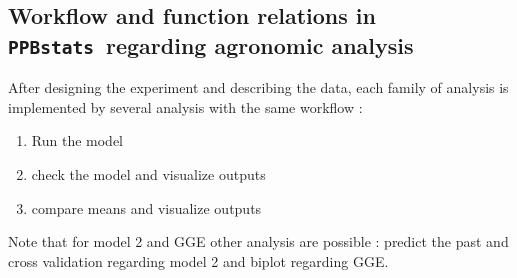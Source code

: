 \documentclass{book}\usepackage[]{graphicx}\usepackage[]{color}
\newcommand{\pack}{\texttt{PPBstats}}
\begin{document}
%
%
%

\subsection{Workflow and function relations in \pack~regarding agronomic analysis}

After designing the experiment and describing the data, each family of analysis is implemented by several analysis with the same workflow :
\begin{enumerate}
\item Run the model
\item check the model and visualize outputs
\item compare means and visualize outputs
\end{enumerate}
Note that for model 2 and GGE other analysis are possible : predict the past and cross validation regarding model 2 and biplot regarding GGE.
\end{document}
